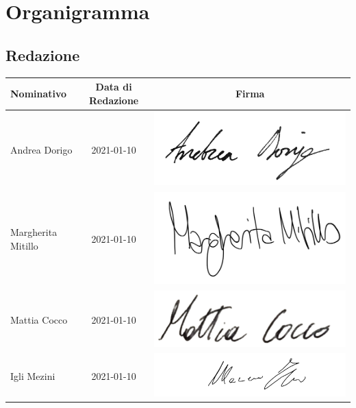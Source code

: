 \chapter{Organigramma}\label{Organigramma}

\section{Redazione}\label{OrganigrammaRedazione}
\quad
\def\tabularxcolumn#1{m{#1}}
{	
	\begin{center}
		\renewcommand{\arraystretch}{1.4}
		\begin{tabularx}{\textwidth}{|X|c|c|}
			\hline
			\rowcolor{airforceblue}
			\textbf{Nominativo} & \textbf{Data di Redazione} & \textbf{Firma}\\
			\hline
			Andrea Dorigo & 2021-01-10 & \includegraphics[width=0.2\linewidth]{../immagini/firme/firma_andrea_dorigo.png}\\
			\hline
			Margherita Mitillo & 2021-01-10 & \includegraphics[width=0.2\linewidth]{../immagini/firme/firma_margherita.png}\\
			\hline
			Mattia Cocco & 2021-01-10 &\includegraphics[width=0.2\linewidth]{../immagini/firme/firma_mattia.png}\\
			\hline
			Igli Mezini & 2021-01-10 &\includegraphics[width=0.3\linewidth]{../immagini/firme/firma_igli.png}\\
			\hline
		\end{tabularx}
	\end{center}

}
